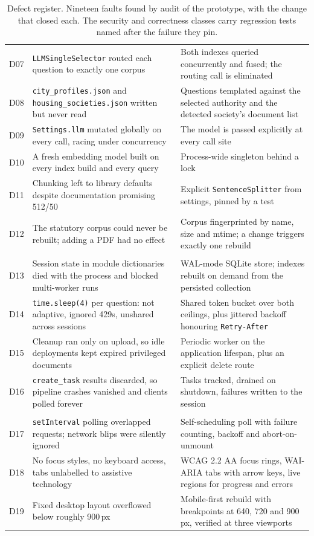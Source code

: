 \documentclass[11pt,a4paper]{article}
\newcommand{\code}[1]{\texttt{\small #1}}
\begin{document}
\begin{table}[H]
\begin{tabularx}{\linewidth}{@{}>{\ttfamily}c L{5.5cm} X@{}}
D07 & \code{LLMSingleSelector} routed each question to exactly one corpus & Both indexes queried concurrently and fused; the routing call is eliminated \\
D08 & \code{city\_profiles.json} and \code{housing\_societies.json} written but never read & Questions templated against the selected authority and the detected society's document list \\
D09 & \code{Settings.llm} mutated globally on every call, racing under concurrency & The model is passed explicitly at every call site \\
D10 & A fresh embedding model built on every index build and every query & Process-wide singleton behind a lock \\
D11 & Chunking left to library defaults despite documentation promising 512/50 & Explicit \code{SentenceSplitter} from settings, pinned by a test \\
D12 & The statutory corpus could never be rebuilt; adding a PDF had no effect & Corpus fingerprinted by name, size and mtime; a change triggers exactly one rebuild \\
\midrule
{} \\
\midrule
D13 & Session state in module dictionaries died with the process and blocked multi-worker runs & WAL-mode SQLite store; indexes rebuilt on demand from the persisted collection \\
D14 & \code{time.sleep(4)} per question: not adaptive, ignored 429s, unshared across sessions & Shared token bucket over both ceilings, plus jittered backoff honouring \code{Retry-After} \\
D15 & Cleanup ran only on upload, so idle deployments kept expired privileged documents & Periodic worker on the application lifespan, plus an explicit delete route \\
D16 & \code{create\_task} results discarded, so pipeline crashes vanished and clients polled forever & Tasks tracked, drained on shutdown, failures written to the session \\
\midrule
{} \\
\midrule
D17 & \code{setInterval} polling overlapped requests; network blips were silently ignored & Self-scheduling poll with failure counting, backoff and abort-on-unmount \\
D18 & No focus styles, no keyboard access, tabs unlabelled to assistive technology & WCAG 2.2 AA focus rings, WAI-ARIA tabs with arrow keys, live regions for progress and errors \\
D19 & Fixed desktop layout overflowed below roughly 900\,px & Mobile-first rebuild with breakpoints at 640, 720 and 900\,px, verified at three viewports \\
\bottomrule
\end{tabularx}
\caption{Defect register. Nineteen faults found by audit of the prototype, with the change that closed each. The security and correctness classes carry regression tests named after the failure they pin.}
\label{tab:defects}
\end{table}
\end{document}
